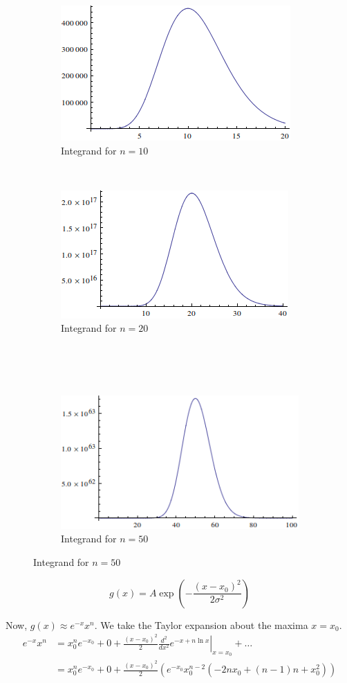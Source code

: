 \documentclass[12pt]{article}
\begin{document}
\begin{figure}[!htb]
\centering
\begin{subfigure}[b]{0.4\textwidth}
\includegraphics[scale=0.5]{gamma10}
\caption{Integrand for $n=10$}
\end{subfigure}
~~~
\begin{subfigure}[b]{0.4\textwidth}
\includegraphics[scale=0.5]{gamma20}
\caption{Integrand for $n=20$}
\end{subfigure}
\\~\\~
\begin{subfigure}[b]{0.4\textwidth}
\includegraphics[scale=0.5]{gamma50}
\caption{Integrand for $n=50$}
\end{subfigure}
\end{figure}

$$g(x)=A\exp\left(-\frac{(x-x_0)^2}{2\sigma^2}\right)$$

Now, $g(x) \approx e^{-x}x^n$. We take the Taylor expansion about the maxima $x=x_0$.
 \begin{align*}
e^{-x}x^n &=x_0^n e^{-x_0} + 0 +
\frac{(x-x_0)^2}{2}\left.\frac{d^2}{dx^2}e^{-x  +n\ln x}\right|_{x=x_0} + \dots\\
&=x_0^n e^{-x_0} + 0 +\frac{(x-x_0)^2}{2}\left(e^{-x_0} x_0^{n-2} \left(-2 n x_0+(n-1) n+x_0^2\right)\right)
\end{align*}
\end{document}
